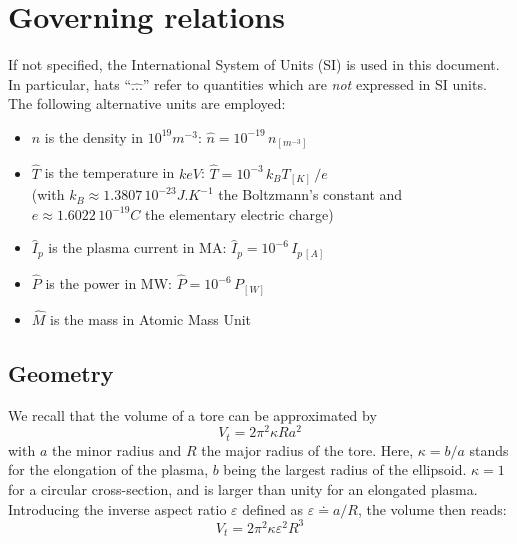 
\section{Governing relations}
\label{sec:governing_eqs}

If not specified, the International System of Units (SI) is used in this document.
In particular, hats ``$\hat{...}$'' refer to quantities which are \emph{not} expressed in SI units. The following alternative units are employed: 
\begin{itemize}
    \item $\hat n$ is the density in $10^{19} \si{m^{-3}}$: 
    $\hat n = 10^{-19}\,n_{\si{[m^{-3}]}}$
    \item $\hat T$ is the temperature in $keV$: $\hat T = 10^{-3}\, k_B T_{[K]}\,/e$ \\(with $k_B \approx 1.3807\, 10^{-23} \si{J.K^{-1}}$ the Boltzmann's constant and $e\approx 1.6022\, 10^{-19}C$ the elementary electric charge)
    \item $\hat I_p$ is the plasma current in MA: $\hat I_p = 10^{-6}\,I_{p\,[A]}$
    \item $\hat P$ is the power in MW: $\hat P = 10^{-6}\, P_{[W]}$
    \item $\hat M$ is the mass in Atomic Mass Unit
\end{itemize}

\subsection{Geometry}

We recall that the volume of a tore can be approximated by 
\begin{equation}
V_t = 2\pi^2 \kappa R a^2
\end{equation}
with $a$ the minor radius and $R$ the major radius of the tore. Here, $\kappa=b/a$ stands for the elongation of the plasma, $b$ being the largest radius of the ellipsoid. $\kappa=1$ for a circular cross-section, and is larger than unity for an elongated plasma.
Introducing the inverse aspect ratio $\varepsilon$ defined as $\varepsilon  \doteq a /R$, the volume then reads:
\begin{equation}
\boxed{V_t = 2\pi^2 \kappa \varepsilon^2 R^3}
\label{eqn:tore_volume}
\end{equation}

